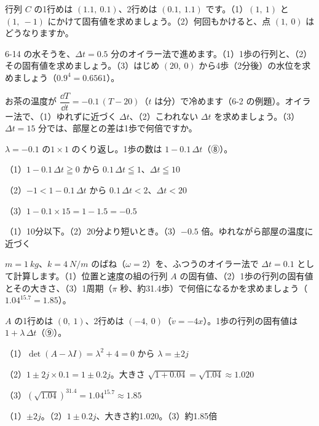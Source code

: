 \begingroup{}%
\noindent\begin{minipage}[t]{0.49\linewidth}
\begin{jibun}
\raggedright 行列 $C$ の1行めは $(1.1,\ 0.1)$、2行めは $(0.1,\ 1.1)$ です。（1）$(1,\ 1)$ と $(1,\ -1)$ にかけて固有値を求めましょう。（2）何回もかけると、点 $(1,\ 0)$ はどうなりますか。
\end{jibun}
\end{minipage}\hfill
\begin{minipage}[t]{0.49\linewidth}
\begin{jibun}
\raggedright 6-14 の水そうを、$\Delta t=0.5$ 分のオイラー法で進めます。（1）1歩の行列と、（2）その固有値を求めましょう。（3）はじめ $(20,\ 0)$ から4歩（2分後）の水位を求めましょう（$0.9^4=0.6561$）。
\end{jibun}
\end{minipage}\par
\endgroup

\begin{reidai}
お茶の温度が $\dfrac{\dd T}{\dd t}=-0.1\,(T-20)$（$t$ は分）で冷めます（6-2 の例題）。オイラー法で、（1）ゆれずに近づく $\Delta t$、（2）こわれない $\Delta t$ を求めましょう。（3）$\Delta t=15$ 分では、部屋との差は1歩で何倍ですか。\par
\kangaekata $\lambda=-0.1$ の$1\times1$ のくり返し。1歩の数は $1-0.1\,\Delta t$（⑧）。\par
\shiki（1）$1-0.1\,\Delta t\geqq0$ から $0.1\,\Delta t\leqq1$、$\Delta t\leqq10$\par
\kviikq（2）$-1<1-0.1\,\Delta t$ から $0.1\,\Delta t<2$、$\Delta t<20$\par
\kviikq（3）$1-0.1\times15=1-1.5=-0.5$\par
\kotae（1）10分以下。（2）20分より短いとき。（3）$-0.5$ 倍。ゆれながら部屋の温度に近づく
\end{reidai}

\begin{reidai}[ばねのふくらみを固有値で]
$m=\qty{1}{kg}$、$k=\qty{4}{N/m}$ のばね（$\omega=2$）を、ふつうのオイラー法で $\Delta t=0.1$ として計算します。（1）位置と速度の組の行列 $A$ の固有値、（2）1歩の行列の固有値とその大きさ、（3）1周期（$\pi$ 秒、約31.4歩）で何倍になるかを求めましょう（$1.04^{15.7}=1.85$）。\par
\kangaekata $A$ の1行めは $(0,\ 1)$、2行めは $(-4,\ 0)$（$\dot v=-4x$）。1歩の行列の固有値は $1+\lambda\,\Delta t$（⑨）。\par
\shiki（1）$\det(A-\lambda I)=\lambda^2+4=0$ から $\lambda=\pm2j$\par
\kviikq（2）$1\pm2j\times0.1=1\pm0.2j$。大きさ $\sqrt{1+0.04}=\sqrt{1.04}\approx1.020$\par
\kviikq（3）$(\sqrt{1.04})^{31.4}=1.04^{15.7}\approx1.85$\par
\kotae（1）$\pm2j$。（2）$1\pm0.2j$、大きさ約1.020。（3）約1.85倍
\end{reidai}


